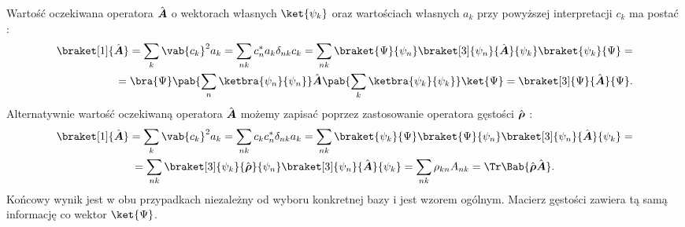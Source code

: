 
Wartość oczekiwana operatora \(\vu{A}\) o wektorach własnych \(\ket{\psi_k}\) oraz wartościach własnych \(a_k\) przy powyższej interpretacji \(c_{k}\) ma postać \cite{townsend_a_modern_approach_to_quantum_mechanics}:
\begin{equation}\label{eq:wart_ocz_wektor}
\begin{split}
	\braket[1]{\vu{A}} = \sum_{k} \vab{c_{k}}^{2} a_{k} = \sum_{nk} c_{n}^{*} a_{k} \delta_{nk} c_{k} = \sum_{nk} \braket{\Psi}{\psi_{n}} \braket[3]{\psi_{n}}{\vu{A}}{\psi_{k}} \braket{\psi_{k}}{\Psi} = \\ = \bra{\Psi}\pab{\sum_{n}\ketbra{\psi_{n}}{\psi_{n}}} \vu{A} \pab{\sum_{k}\ketbra{\psi_{k}}{\psi_{k}}} \ket{\Psi} = \braket[3]{\Psi}{\vu{A}}{\Psi}.
\end{split}
\end{equation}
Alternatywnie wartość oczekiwaną operatora \(\vu{A}\) możemy zapisać poprzez zastosowanie operatora gęstości \(\vu{\rho}\) \cite{zubariew}:
\begin{multline}\label{eq:wart_ocz_macierz_czysty}
	\braket[1]{\vu{A}} = \sum_{k} \vab{c_k}^2 a_{k} = \sum_{nk} c_{k} c_{n}^{*} \delta_{nk} a_{k} =
	\sum_{nk} \braket{\psi_k}{\Psi} \braket{\Psi}{\psi_n} \braket[3]{\psi_n}{\vu{A}}{\psi_k} = \\ =
	\sum_{nk} \braket[3]{\psi_k}{\vu{\rho}}{\psi_n} \braket[3]{\psi_n}{\vu{A}}{\psi_k} =
	\sum_{nk} \rho_{kn} A_{nk} = \Tr\Bab{\vu{\rho}\vu{A}}.
\end{multline}
Końcowy wynik jest w obu przypadkach niezależny od wyboru konkretnej bazy i jest wzorem ogólnym. Macierz gęstości zawiera tą samą informację co wektor \(\ket{\Psi}\).

